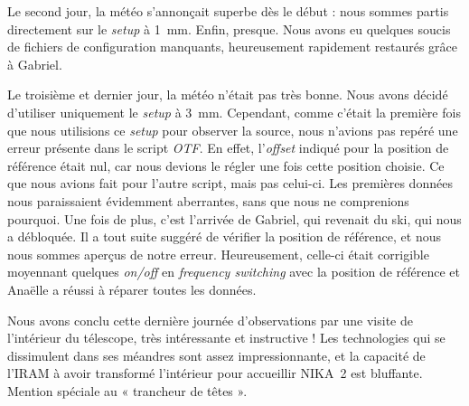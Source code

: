 \documentclass[a4paper,10pt,french]{article}
\newcommand{\setup}{\textit{setup}}
\newcommand{\troismm}{\SI{3}{\milli\meter}}
\newcommand{\unmm}{\SI{1}{\milli\meter}}
\begin{document}
Le second jour, la météo s’annonçait superbe dès le début : nous sommes partis
directement sur le \setup{} à \unmm. Enfin, presque. Nous avons eu quelques
soucis de fichiers de configuration manquants, heureusement rapidement
restaurés grâce à Gabriel.

Le troisième et dernier jour, la météo n’était pas très bonne. Nous avons
décidé d’utiliser uniquement le \setup{} à \troismm. Cependant, comme c’était
la première fois que nous utilisions ce \setup{} pour observer la source, nous
n’avions pas repéré une erreur présente dans le script \textit{OTF}. En effet,
l’\textit{offset} indiqué pour la position de référence était nul, car nous
devions le régler une fois cette position choisie. Ce que nous avions fait pour
l’autre script, mais pas celui-ci. Les premières données nous paraissaient
évidemment aberrantes, sans que nous ne comprenions pourquoi. Une fois de plus,
c’est l’arrivée de Gabriel, qui revenait du ski, qui nous a débloquée. Il a
tout suite suggéré de vérifier la position de référence, et nous nous sommes
aperçus de notre erreur. Heureusement, celle-ci était corrigible moyennant
quelques \textit{on/off} en \textit{frequency switching} avec la position de
référence et Anaëlle a réussi à réparer toutes les données.

Nous avons conclu cette dernière journée d’observations par une visite de
l’intérieur du télescope, très intéressante et instructive ! Les technologies
qui se dissimulent dans ses méandres sont assez impressionnante, et la capacité
de l’IRAM à avoir transformé l’intérieur pour accueillir NIKA~2 est bluffante.
Mention spéciale au « trancheur de têtes ».
\end{document}
